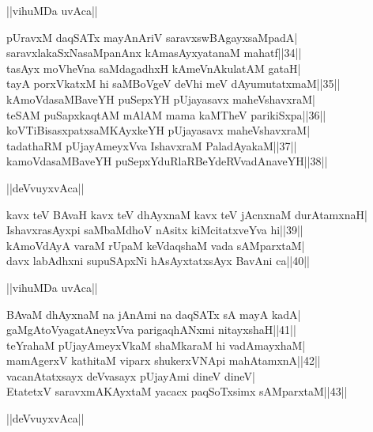 \documentclass{article}
\begin{document}
\begin{center}
||vihuMDa uvAca||
\end{center}

pUravxM daqSATx mayAnAriV saravxswBAgayxsaMpadA|\\
saravxlakaSxNasaMpanAnx kAmasAyxyatanaM mahatf||34||\\
tasAyx moVheVna saMdagadhxH kAmeVnAkulatAM gataH|\\
tayA porxVkatxM hi saMBoVgeV deVhi meV dAyumutatxmaM||35||\\
kAmoVdasaMBaveYH puSepxYH pUjayasavx maheVshavxraM|\\
teSAM puSapxkaqtAM mAlAM mama kaMTheV parikiSxpa||36||\\
koVTiBisasxpatxsaMKAyxkeYH pUjayasavx maheVshavxraM|\\
tadathaRM pUjayAmeyxVva IshavxraM PaladAyakaM||37||\\
kamoVdasaMBaveYH puSepxYduRlaRBeYdeRVvadAnaveYH||38||\\

\begin{center}
||deVvuyxvAca||
\end{center}

kavx teV BAvaH kavx teV dhAyxnaM kavx teV jAcnxnaM durAtamxnaH|\\
IshavxrasAyxpi saMbaMdhoV nAsitx kiMcitatxveYva hi||39||\\
kAmoVdAyA varaM rUpaM keVdaqshaM vada sAMparxtaM|\\
davx labAdhxni supuSApxNi hAsAyxtatxsAyx BavAni ca||40||\\

\begin{center}
||vihuMDa uvAca||
\end{center}

BAvaM dhAyxnaM na jAnAmi na daqSATx sA mayA kadA|\\
gaMgAtoVyagatAneyxVva parigaqhANxmi nitayxshaH||41||\\
teYrahaM pUjayAmeyxVkaM shaMkaraM hi vadAmayxhaM|\\
mamAgerxV kathitaM viparx shukerxVNApi mahAtamxnA||42||\\
vacanAtatxsayx deVvasayx pUjayAmi dineV dineV|\\
EtatetxV saravxmAKAyxtaM yacacx paqSoTxsimx sAMparxtaM||43||\\

\begin{center}
||deVvuyxvAca||
\end{center}
\end{document}
